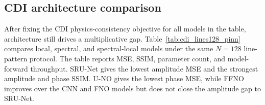 \documentclass[11pt]{article}
\begin{document}
\begin{table}[t]
\centering
\scriptsize
\setlength{\tabcolsep}{2pt}
\caption{\textbf{CDI supervised and physics-consistency training.}
Each pair compares physics-consistency and supervised training for the same
architecture when both trainings were run. This comparison tests the training
loss, not the architecture alone. Bold marks the better value within each
model pair. Lower MAE is better; higher SSIM is better.}
\label{tab:cdi_lines128_objective_controls}

\end{table}

\subsection{CDI architecture comparison}

After fixing the CDI physics-consistency objective for all models in the table,
architecture still drives a multiplicative gap.
Table~\ref{tab:cdi_lines128_pinn} compares local, spectral, and spectral-local
models under the same $N=128$ line-pattern protocol. The table reports MSE,
SSIM, parameter count, and model-forward throughput. SRU-Net gives the lowest
amplitude MSE and the strongest amplitude and phase SSIM. U-NO gives the
lowest phase MSE, while FFNO improves over the CNN and FNO models but does not
close the amplitude gap to SRU-Net.

\begin{table}[t]
\centering
\scriptsize
\setlength{\tabcolsep}{2pt}
\caption{\textbf{CDI architecture comparison under
physics-consistency training.} All models use the same $N=128$ line-pattern
protocol and CDI physics-consistency objective. Throughput is measured as CDI
patches per second for synchronized model-forward timing artifacts; ``--''
means no synchronized timing artifact was available. Lower MSE is better;
higher SSIM and throughput are better.}
\label{tab:cdi_lines128_pinn}

\end{table}
\end{document}
